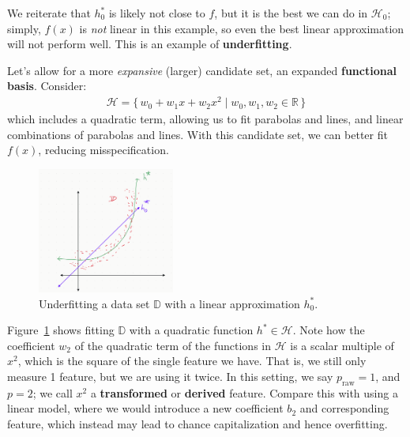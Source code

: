 \documentclass[12pt, a4paper]{article}
\theoremstyle{definition}
\begin{document}
	We reiterate that $h_0^*$ is likely not close to $f$, but it is the best we can do in
	$\mathcal{H}_0$; simply, $f(x)$ is \textit{not} linear in this example, so
	even the best linear approximation will not perform well. This is an example of
	\textbf{underfitting}.
	
	Let's allow for a more \textit{expansive} (larger) candidate set, an expanded
	\textbf{functional basis}. Consider:
	\begin{align*}
		\mathcal{H} = \{\, w_0 + w_1x + w_2x^2 \mid w_0,w_1,w_2\in\mathbb{R}\,\}
	\end{align*}
	which includes a quadratic term, allowing us to fit parabolas and lines, and
	linear combinations of parabolas and lines. With this candidate set,
	we can better fit $f(x)$, reducing misspecification.
	\begin{figure}
		\centering
		\includegraphics[width=0.4\textwidth]{better-fit-with-quadratic-function}
		\caption{Underfitting a data set $\mathbb{D}$ with a linear approximation
			$h_0^*$.}
		\label{fig:better-fit-D-with-quadratic}
	\end{figure}
	Figure~\ref{fig:better-fit-D-with-quadratic} shows fitting $\mathbb{D}$ with
	a quadratic function $h^*\in \mathcal{H}$. Note how the coefficient $w_2$
	of the quadratic term of the functions in $\mathcal{H}$ is a scalar
	multiple of $x^2$, which is the square of the single feature we have.
	That is, we still only measure 1 feature, but we are using it twice. In this
	setting, we say $p_{\text{raw}} = 1$, and $p=2$; we call $x^2$ a \textbf{transformed}
	or \textbf{derived} feature. Compare this with using a linear model, where we
	would introduce a new coefficient $b_2$ and corresponding feature, which instead
	may lead to chance capitalization and hence overfitting.
	
\end{document}
